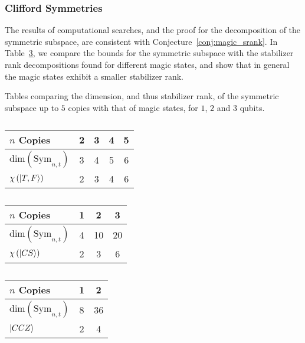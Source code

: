 \subsubsection*{Clifford Symmetries}
The results of computational searches, and the proof for the decomposition of the symmetric subspace, are consistent with Conjecture~\ref{conj:magic_srank}. In Table~\ref{tab:srank_tables}, we compare the bounds for the symmetric subspace with the stabilizer rank decompositions found for different magic states, and show that in general the magic states exhibit a smaller stabilizer rank.\par
\begin{table}[H]
\centering
\caption{Tables comparing the dimension, and thus stabilizer rank, of the symmetric subspace up to $5$ copies with that of magic states, for $1$, $2$ and $3$ qubits.}\label{tab:srank_tables}
    \begin{subtable}[t]{0.6\textwidth}
    \caption{}
    \centering
        \begin{tabular}{|l|c|c|c|c|}
            \hline
            $n$ Copies & 2 & 3 & 4 & 5 \\
            \hline
            $\text{dim}\left(\text{Sym}_{n,t}\right)$ & 3 & 4 & 5 & 6 \\
            $\chi\left(\ket{T,F}\right)$ & 2 & 3 & 4 & 6 \\ \hline
        \end{tabular}
        \vspace{1cm}
    \end{subtable}
    \begin{subtable}[t]{0.48\textwidth}
    \centering
        \begin{tabular}{|l|c|c|c|}
            \hline
            $n$ Copies & 1 & 2 & 3 \\ \hline
            $\text{dim}\left(\text{Sym}_{n,t}\right)$ & 4 & 10 & 20 \\
            $\chi\left(\ket{CS}\right)$ & 2 & 3 & 6 \\ \hline
        \end{tabular}
        \caption{}
    \end{subtable}
    \begin{subtable}[t]{0.48\textwidth}
    \centering
        \begin{tabular}{|l|c|c|}
            \hline
            $n$ Copies & 1 & 2 \\ \hline
            $\text{dim}\left(\text{Sym}_{n,t}\right)$ & 8 & 36 \\
            $\ket{CCZ}$ & 2 & 4 \\ \hline
        \end{tabular}
        \caption{}
    \end{subtable}
\end{table}
